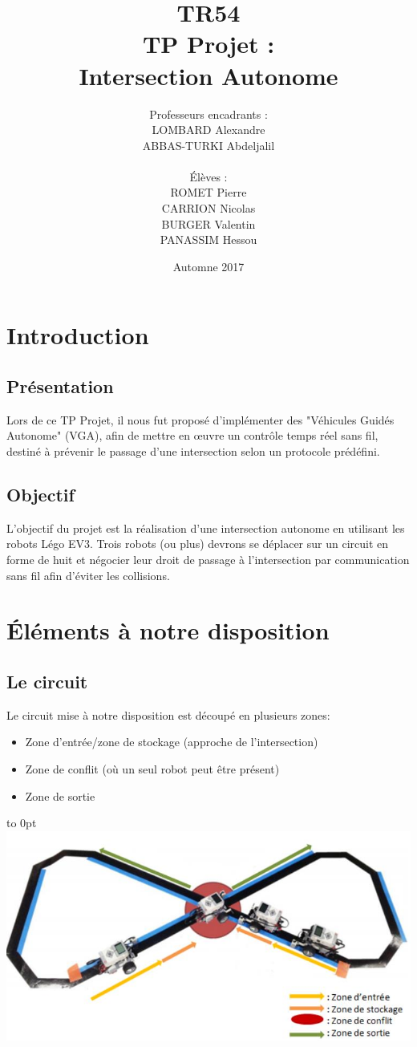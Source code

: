 \documentclass[french,a4paper,12pt]{report}
\title{TR54 \\ TP Projet :\\ Intersection Autonome}
\author{Professeurs encadrants :\\LOMBARD Alexandre \\ ABBAS-TURKI Abdeljalil\\\\ Élèves :\\ROMET Pierre\\CARRION Nicolas\\BURGER Valentin\\PANASSIM Hessou}
\date{Automne 2017}
\begin{document}
\maketitle

\tableofcontents

\part{Introduction}
\chapter{Présentation}
Lors de ce TP Projet,
il nous fut proposé d'implémenter des "Véhicules Guidés Autonome" (VGA), afin de mettre en œuvre un contrôle
temps réel sans fil, destiné à prévenir le passage d'une intersection selon un protocole prédéfini.

\chapter{Objectif}
L'objectif du projet est la réalisation d'une intersection autonome en utilisant les robots Légo EV3.
Trois robots (ou plus) devrons se déplacer sur un circuit en forme de huit et négocier leur droit de passage à
l'intersection par communication sans fil afin d'éviter les collisions.

\part{Éléments à notre disposition}

\chapter{Le circuit}
Le circuit mise à notre disposition est découpé en plusieurs zones:
\begin{itemize}
\item Zone d’entrée/zone de stockage (approche de l’intersection)
\item Zone de conflit (où un seul robot peut être présent)
\item Zone de sortie
\end{itemize}

\hfill\hbox to 0pt{\hss\includegraphics[width=15cm]{circuit.png}\hss}\hfill\null\newline
\end{document}
